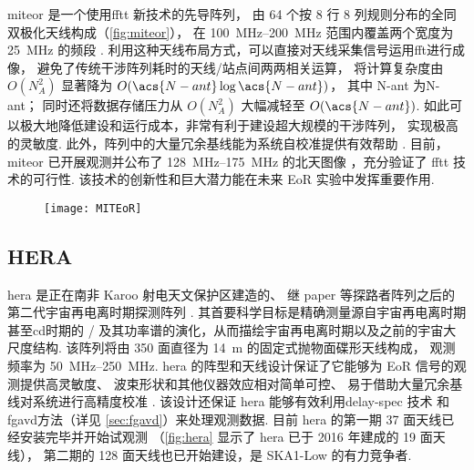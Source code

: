 \acf{miteor} 是一个使用\ac{fftt} 新技术\cite{tegmark2009,tegmark2010}的先导阵列，
由 64 个按 8 行 8 列规则分布的全同双极化天线构成（\autoref{fig:miteor}），
在 \SIrange{100}{200}{\MHz} 范围内覆盖两个宽度为 \SI{25}{\MHz} 的频段
\cite{zheng2014}.
利用这种天线布局方式，可以直接对天线采集信号运用\ac{fft}进行成像，
避免了传统干涉阵列耗时的天线/站点间两两相关运算，
将计算复杂度由 $O(N_{\!A}^2)$ 显著降为 $O(\acs{N-ant} \log\acs{N-ant})$，
其中 \acs{N-ant} 为\acl{N-ant}；
同时还将数据存储压力从 $O(N_{\!A}^2)$ 大幅减轻至 $O(\acs{N-ant})$.
如此可以极大地降低建设和运行成本，非常有利于建设超大规模的干涉阵列，
实现极高的灵敏度.
此外，阵列中的大量冗余基线能为系统自校准提供有效帮助 \cite{dillon2016}.
目前，\ac{miteor} 已开展观测并公布了 \SIrange{128}{175}{\MHz} 的北天图像
\cite{zheng2017}，充分验证了 \ac{fftt} 技术的可行性.
该技术的创新性和巨大潜力能在未来 EoR 实验中发挥重要作用.

\begin{figure}[htp]
  \centering
  \texttt{[image: MITEoR]}
  \label{fig:miteor}
\end{figure}

\subsection{HERA}

\acf{hera} 是正在南非 Karoo 射电天文保护区建造的、
继 \ac{paper} 等探路者阵列之后的第二代宇宙再电离时期探测阵列 \cite{deboer2017}.
其首要科学目标是精确测量源自宇宙再电离时期甚至\ac{cd}时期的 \hisignal/
及其功率谱的演化，从而描绘宇宙再电离时期以及之前的宇宙大尺度结构.
该阵列将由 350 面直径为 \SI{14}{\meter} 的固定式抛物面碟形天线构成，
观测频率为 \SIrange{50}{250}{\MHz}.
\acs{hera} 的阵型和天线设计保证了它能够为 EoR 信号的观测提供高灵敏度、
波束形状和其他仪器效应相对简单可控、
易于借助大量冗余基线对系统进行高精度校准 \cite{dillon2016}.
该设计还保证 \acs{hera} 能够有效利用\ac{delay-spec} 技术\cite{parsons2012}
和\ac{fgavd}方法（详见 \autoref{sec:fgavd}）来处理观测数据.
目前 \acs{hera} 的第一期 37 面天线已经安装完毕并开始试观测
（\autoref{fig:hera} 显示了 \acs{hera} 已于 2016 年建成的 19 面天线），
第二期的 128 面天线也已开始建设，是 SKA1-Low 的有力竞争者.

